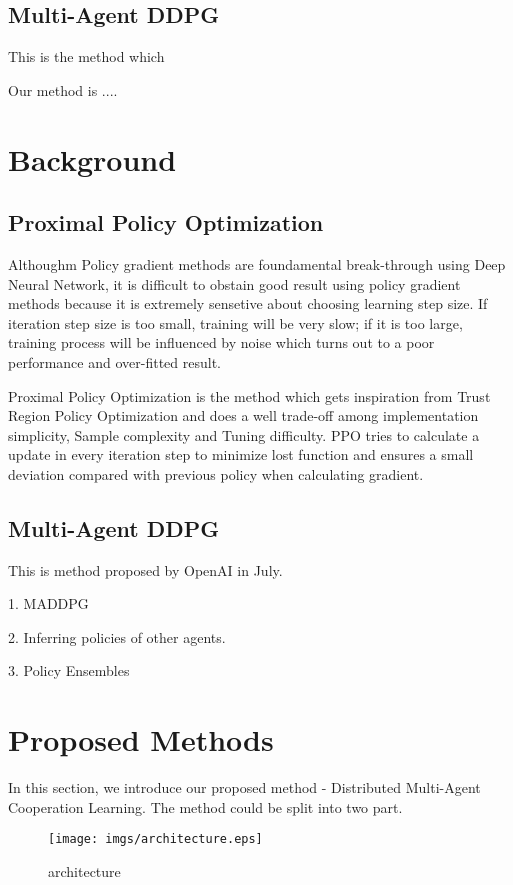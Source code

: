 \documentclass[11pt,twocolumn]{jarticle} %
\begin{document}
\subsection{Multi-Agent DDPG}
This is the method which 

Our method is ....

\section{Background}

\subsection{Proximal Policy Optimization}
Althoughm Policy gradient methods are foundamental break-through using Deep Neural Network, it is difficult to obstain good result using policy gradient methods because it is extremely sensetive about choosing learning step size. If iteration step size is too small, training will be very slow; if it is too large, training process will be influenced by noise which turns out to a poor performance and over-fitted result. \par
Proximal Policy Optimization is the method which gets inspiration from Trust Region Policy Optimization and does a well trade-off among implementation simplicity, Sample complexity and Tuning difficulty. PPO tries to calculate a update in every iteration step to minimize lost function and ensures a small deviation compared with previous policy when calculating gradient.
\subsection{Multi-Agent DDPG}
This is method proposed by OpenAI in July. \par
1. MADDPG \par
2. Inferring policies of other agents. \par
3. Policy Ensembles
\section{Proposed Methods}
In this section, we introduce our proposed method - Distributed Multi-Agent Cooperation Learning. The method could be split into two part. 

\begin{figure*}[t]
 \begin{center}
  \texttt{[image: imgs/architecture.eps]}
  \caption{architecture}
  \label{fig:architecture}
 \end{center}
\end{figure*}
\end{document}
